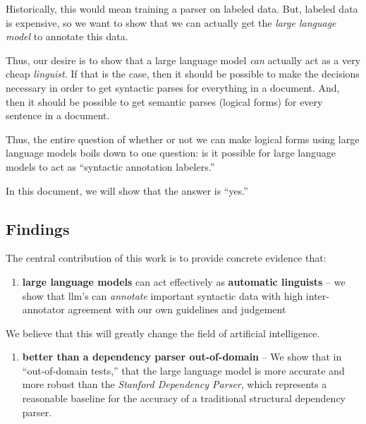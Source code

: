 Historically, this would mean training a parser on labeled data.
But, labeled data is expensive, so we want to show that we can actually get the {\em large language model} to annotate this data.

Thus, our desire is to show that a large language model {\em can} actually act as a very cheap {\em linguist}.
If that is the case, then it should be possible to make the decisions necessary in order to get syntactic parses for everything in a document.
And, then it should be possible to get semantic parses (logical forms) for every sentence in a document.

Thus, the entire question of whether or not we can make logical forms using large language models boils down to one question: is it possible for large language models to act as ``syntactic annotation labelers.''

In this document, we will show that the answer is ``yes.''

\subsection{Findings}
The central contribution of this work is to provide concrete evidence that:
\begin{enumerate}
    \item {\bf large language models} can act effectively as {\bf automatic linguists} -- we show that llm's can {\em annotate} important syntactic data with high inter-annotator agreement with our own guidelines and judgement
\end{enumerate}
We believe that this will greatly change the field of artificial intelligence.



\begin{enumerate}
    \item {\bf better than a dependency parser out-of-domain} --
We show that in ``out-of-domain tests,'' that the large language model is more accurate and more robust than the {\em Stanford Dependency Parser}, which represents a reasonable baseline for the accuracy of a traditional structural dependency parser.
\end{enumerate}